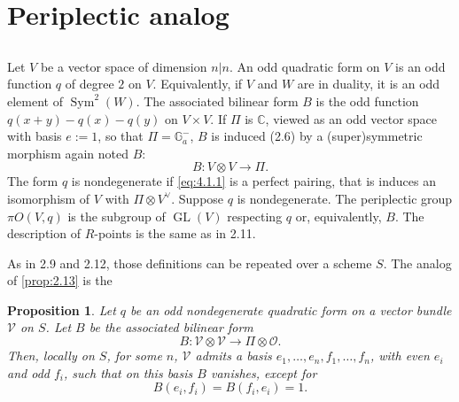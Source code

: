 \documentclass[11pt,a4paper]{article}
\theoremstyle{plain}
\newtheorem{proposition}[theorem]{Proposition}
\theoremstyle{definition}
\DeclareMathOperator{\GL}{GL}
\DeclareMathOperator{\Sym}{Sym}
\newcommand{\C}{\mathbb{C}}
\begin{document}
\section{Periplectic analog}

\subsection{}
Let $V$ be a vector space of dimension $n|n$. An odd quadratic form on $V$ is an odd function $q$ of degree $2$ on $V$. Equivalently, if $V$ and $W$ are in duality, it is an odd element of $\Sym^2(W)$. The associated bilinear form $B$ is the odd function $q(x+y) - q(x) - q(y)$ on $V \times V$. If $\Pi$ is $\C$, viewed as an odd vector space with basis $e := 1$, so that $\Pi = \mathbb{G}_a^-$, $B$ is induced (2.6) by a (super)symmetric morphism again noted $B$:
\begin{equation}\label{eq:4.1.1}
B : V \otimes V \to \Pi.
\end{equation}
The form $q$ is nondegenerate if \eqref{eq:4.1.1} is a perfect pairing, that is induces an isomorphism of $V$ with $\Pi \otimes V^\vee$. Suppose $q$ is nondegenerate. The periplectic group $\pi O(V,q)$ is the subgroup of $\GL(V)$ respecting $q$ or, equivalently, $B$. The description of $R$-points is the same as in 2.11.

As in 2.9 and 2.12, those definitions can be repeated over a scheme $S$. The analog of \ref{prop:2.13} is the

\begin{proposition}\label{prop:4.2}
Let $q$ be an odd nondegenerate quadratic form on a vector bundle $\mathcal{V}$ on $S$. Let $B$ be the associated bilinear form
\[
B : \mathcal{V} \otimes \mathcal{V} \to \Pi \otimes \mathcal{O}.
\]
Then, locally on $S$, for some $n$, $\mathcal{V}$ admits a basis $e_1,\dots,e_n, f_1,\dots,f_n$, with even $e_i$ and odd $f_i$, such that on this basis $B$ vanishes, except for
\[
B(e_i, f_i) = B(f_i, e_i) = 1.
\]
\end{proposition}
\end{document}
